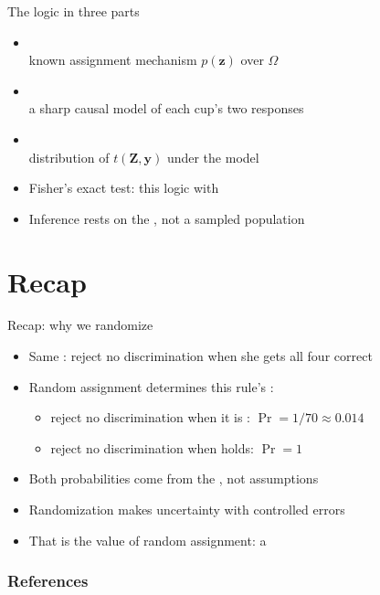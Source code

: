 \documentclass[table, xcolor = {dvipsnames}, 9pt]{beamer}
\theoremstyle{plain}
\newcommand{\mh}[1]{{\color{magenta}{#1}}}
\begin{document}
\begin{frame}{The logic in three parts}
\vfill
\begin{itemize} \vfill
\item \mh{Design} \\ known assignment mechanism $p(\bm{z})$ over $\Omega$ \vfill
\item \mh{Model} \\ a sharp causal model of each cup's two responses \vfill
\item \mh{Test} \\ distribution of $t(\bm{Z},\bm{y})$ under the model \vfill
\item Fisher's exact test: this logic with \mh{no discrimination} \vfill
\item Inference rests on the \mh{design}, not a sampled population \vfill
\end{itemize} \vfill
\end{frame}
\section{Recap}

\begin{frame}{Recap: why we randomize}
\vfill
\begin{itemize} \vfill
\item Same \mh{rule}: reject no discrimination when she gets all four correct \vfill
\item Random assignment determines this rule's \mh{error probabilities}: \vfill
\begin{itemize} \vfill
\item reject no discrimination when it is \mh{true}: $\Pr = 1/70 \approx 0.014$ \vfill
\item reject no discrimination when \mh{perfect discrimination} holds: $\Pr = 1$ \vfill
\end{itemize} \vfill
\item Both probabilities come from the \mh{design}, not assumptions \vfill
\item Randomization makes uncertainty \mh{known} with controlled errors \vfill
\item That is the value of random assignment: a \mh{reasoned basis for inference} \vfill
\end{itemize} \vfill
\end{frame}
\begin{frame}
\frametitle{References} 
\scriptsize

\end{frame}
\end{document}
